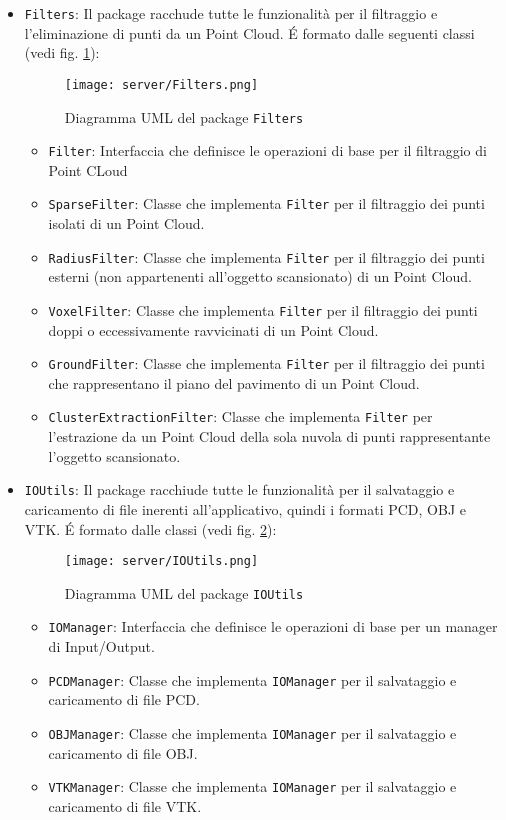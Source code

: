 \begin{itemize}
\item\texttt{Filters}:
	Il package racchude tutte le funzionalità per il filtraggio e l'eliminazione di punti da un Point Cloud. \'E formato dalle seguenti classi (vedi fig. \ref{fig:Filters}):
	\begin{figure}[!h] 
	    \centering 
	    \texttt{[image: server/Filters.png]} 
	    \caption{Diagramma UML del package \texttt{Filters}}
	   \label{fig:Filters}
	\end{figure}
	\begin{itemize}
	\item\texttt{Filter}: Interfaccia che definisce le operazioni di base per il filtraggio di Point CLoud
	\item\texttt{SparseFilter}: Classe che implementa \texttt{Filter} per il filtraggio dei punti isolati di un Point Cloud.
	\item\texttt{RadiusFilter}: Classe che implementa \texttt{Filter} per il filtraggio dei punti esterni (non appartenenti all'oggetto scansionato) di un Point Cloud.
	\item\texttt{VoxelFilter}: Classe che implementa \texttt{Filter} per il filtraggio dei punti doppi o eccessivamente ravvicinati di un Point Cloud.
	\item\texttt{GroundFilter}: Classe che implementa \texttt{Filter} per il filtraggio dei punti che rappresentano il piano del pavimento di un Point Cloud.
	\item\texttt{ClusterExtractionFilter}: Classe che implementa \texttt{Filter} per l'estrazione da un Point Cloud della sola nuvola di punti rappresentante l'oggetto scansionato.
	\end{itemize}

\item\texttt{IOUtils}:
	Il package racchiude tutte le funzionalità per il salvataggio e caricamento di file inerenti all'applicativo, quindi i formati PCD, OBJ e VTK. \'E formato dalle classi (vedi fig. \ref{fig:IOUtils}):
	\begin{figure}[!h] 
	    \centering 
	    \texttt{[image: server/IOUtils.png]} 
	    \caption{Diagramma UML del package \texttt{IOUtils}}
	   \label{fig:IOUtils}
	\end{figure}
	\begin{itemize}
	\item\texttt{IOManager}: Interfaccia che definisce le operazioni di base per un manager di Input/Output.
	\item\texttt{PCDManager}: Classe che implementa \texttt{IOManager} per il salvataggio e caricamento di file PCD.
	\item\texttt{OBJManager}: Classe che implementa \texttt{IOManager} per il salvataggio e caricamento di file OBJ.
	\item\texttt{VTKManager}: Classe che implementa \texttt{IOManager} per il salvataggio e caricamento di file VTK.
	\end{itemize}
\end{itemize}

